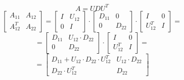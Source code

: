 \documentclass{article}
\begin{document}
\[
A = UDU^T
\]
\vspace{5pt}
\[
\begin{bmatrix}
    A_{11} & A_{12}\\
    A_{12}^T & A_{22}
\end{bmatrix}
=
\begin{bmatrix}
    I & U_{12}\\
    0 & I
\end{bmatrix}
\cdot
\begin{bmatrix}
    D_{11} & 0\\
    0 & D_{22}
\end{bmatrix}
\cdot
\begin{bmatrix}
    I & 0\\
    U_{12}^T & I
\end{bmatrix}
=
\]
\[
=
\begin{bmatrix}
    D_{11} & U_{12} \cdot D_{22}\\
    0 & D_{22}
\end{bmatrix}
\cdot
\begin{bmatrix}
    I & 0\\
    U_{12}^T & I
\end{bmatrix}
=
\]
\[
=
\begin{bmatrix}
    D_{11} + U_{12} \cdot D_{22} \cdot U_{12}^T & U_{12} \cdot D_{22}\\
    D_{22} \cdot U_{12}^T & D_{22}
\end{bmatrix}
\]


\vspace{10pt}
\end{document}
